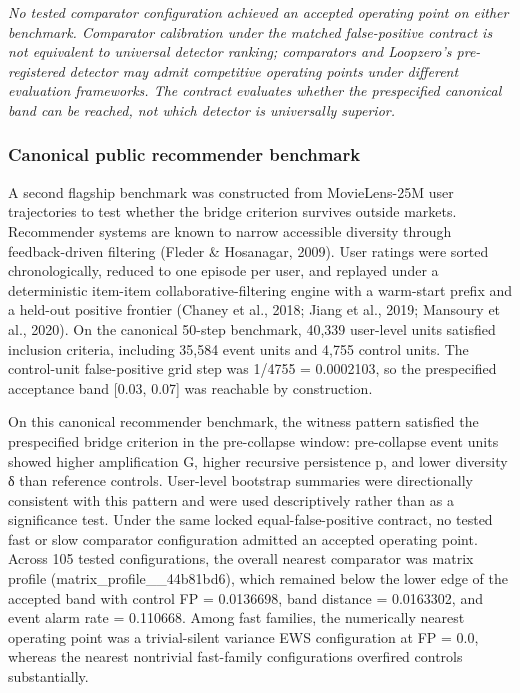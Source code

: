 \documentclass[
  11pt,
]{article}
\begin{document}
\emph{No tested comparator configuration achieved an accepted operating
point on either benchmark. Comparator calibration under the matched
false-positive contract is not equivalent to universal detector ranking;
comparators and Loopzero's pre-registered detector may admit competitive
operating points under different evaluation frameworks. The contract
evaluates whether the prespecified canonical band can be reached, not
which detector is universally superior.}

\subsubsection{Canonical public recommender
benchmark}\label{canonical-public-recommender-benchmark}

A second flagship benchmark was constructed from MovieLens-25M user
trajectories to test whether the bridge criterion survives outside
markets. Recommender systems are known to narrow accessible diversity
through feedback-driven filtering (Fleder \& Hosanagar, 2009). User
ratings were sorted chronologically, reduced to one episode per user,
and replayed under a deterministic item-item collaborative-filtering
engine with a warm-start prefix and a held-out positive frontier (Chaney
et al., 2018; Jiang et al., 2019; Mansoury et al., 2020). On the
canonical 50-step benchmark, 40,339 user-level units satisfied inclusion
criteria, including 35,584 event units and 4,755 control units. The
control-unit false-positive grid step was 1/4755 = 0.0002103, so the
prespecified acceptance band {[}0.03, 0.07{]} was reachable by
construction.

On this canonical recommender benchmark, the witness pattern satisfied
the prespecified bridge criterion in the pre-collapse window:
pre-collapse event units showed higher amplification G, higher recursive
persistence p, and lower diversity δ than reference controls. User-level
bootstrap summaries were directionally consistent with this pattern and
were used descriptively rather than as a significance test. Under the
same locked equal-false-positive contract, no tested fast or slow
comparator configuration admitted an accepted operating point. Across
105 tested configurations, the overall nearest comparator was matrix
profile (matrix\_profile\_\_44b81bd6), which remained below the lower
edge of the accepted band with control FP = 0.0136698, band distance =
0.0163302, and event alarm rate = 0.110668. Among fast families, the
numerically nearest operating point was a trivial-silent variance EWS
configuration at FP = 0.0, whereas the nearest nontrivial fast-family
configurations overfired controls substantially.
\end{document}
